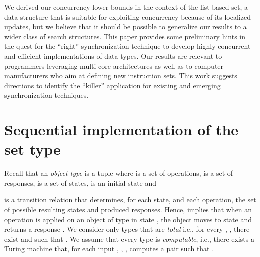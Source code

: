 \documentclass[11pt,pdftex,letterpaper]{article}
\begin{document}
We derived our concurrency lower bounds in the context of the list-based set, a data structure
that is suitable for exploiting concurrency because of its localized
updates, but we believe that it should be possible to generalize our results to a wider class of search structures. 
This paper provides some preliminary hints in the quest for 
the ``right'' synchronization technique to develop highly concurrent and efficient implementations of data 
types.
Our results are relevant to programmers leveraging
multi-core architectures as well as to computer manufacturers 
who aim at defining new instruction sets.
This work suggests directions to identify the ``killer'' application
for existing and emerging synchronization techniques.
 
\newpage


\appendix
\section{Sequential implementation of the set type}
\label{app:seq}
Recall that an \emph{object type}  is a tuple
 where
 is a set of operations,
 is a set of responses,  is a set of states,  is an
initial state and 
 
is a transition relation that determines, for each state,
and each operation, the set of possible
resulting states and  produced responses. 
Hence,  implies that when
an operation  is applied on an object of type 
in state , the object moves to state  and returns a response .
We consider only types that are \emph{total}
 i.e., for every ,
, there exist   and
 such that .
We assume that every type  is \emph{computable}, i.e., 
there exists a Turing machine that, 
for each input , , , computes
a pair  such that .
\end{document}
